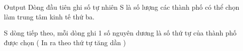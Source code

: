 Output  
Dòng đầu tiên ghi số tự nhiên S là số lượng các thành phố có thể chọn làm trung tâm kinh tế thứ ba.  

   S dòng tiếp theo, mỗi dòng ghi 1 số nguyên dương là số thứ tự của thành phố được chọn ( In ra theo thứ tự tăng dần )